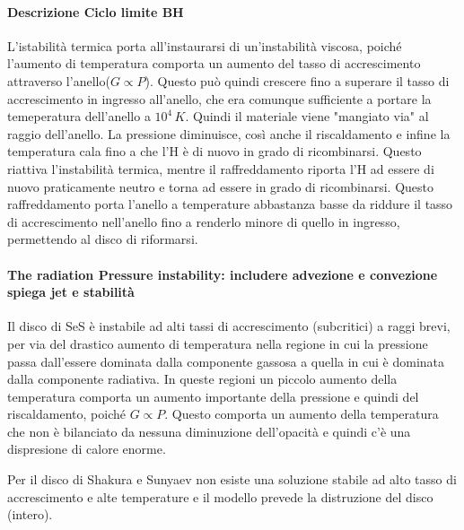 \documentclass[a4paperbi]{article}
\begin{document}
	\paragraph{Descrizione Ciclo limite BH}
	L'istabilità termica porta all'instaurarsi di un'instabilità viscosa, poiché l'aumento di temperatura comporta un aumento del tasso di accrescimento attraverso l'anello($G\propto P$). Questo può quindi crescere fino a superare il tasso di accrescimento in ingresso all'anello, che era comunque sufficiente a portare la temeperatura dell'anello a $10^4\,K$. Quindi il materiale viene "mangiato via" al raggio dell'anello. La pressione diminuisce, così anche il riscaldamento e infine la temperatura cala fino a che l'H è di nuovo in grado di ricombinarsi. Questo riattiva l'instabilità termica, mentre il raffreddamento riporta l'H ad essere di nuovo praticamente neutro
 e torna ad essere in grado di ricombinarsi. Questo raffreddamento porta l'anello a temperature abbastanza basse da riddure il tasso di accrescimento nell'anello fino a renderlo minore di quello in ingresso, permettendo al disco di riformarsi.
 
\paragraph{The radiation Pressure instability: includere advezione e convezione spiega jet e stabilità}

	Il disco di SeS è instabile ad alti tassi di accrescimento (subcritici) a raggi brevi, per via del drastico aumento di temperatura nella regione in cui la pressione passa dall'essere dominata dalla componente gassosa a quella in cui è dominata dalla componente radiativa. In queste regioni un piccolo aumento della temperatura comporta un aumento importante della pressione e quindi del riscaldamento, poiché $G\propto P$. Questo comporta un aumento della temperatura che non è bilanciato da nessuna diminuzione dell'opacità e quindi c'è una dispresione di calore enorme.

	Per il disco di Shakura e Sunyaev non esiste una soluzione stabile ad alto tasso di accrescimento e alte temperature e il modello prevede la distruzione del disco (intero).
	
\end{document}
